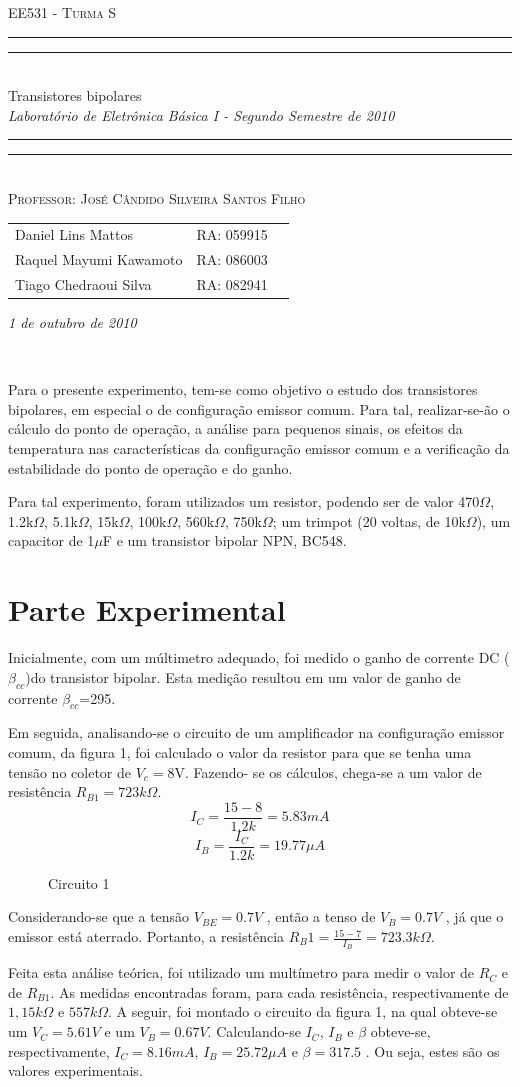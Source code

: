 \documentclass[a4paper]{article} %
\date{Outubro 1, 2010}
\newcommand*{\titleTMB}{\begingroup \centering \settowidth{\unitlength}{\LARGE EE531} {\large\scshape EE531 - Turma S}\\[0.2\baselineskip] \rule{11.0cm}{1.6pt}\vspace*{-\baselineskip}\vspace*{2pt} \rule{11.0cm}{0.4pt}\\[\baselineskip] {\LARGE Transistores bipolares}\\\vspace*{\baselineskip}  {\itshape Laboratório de Eletrônica Básica I - Segundo Semestre de 2010}\\ \rule{11.0cm}{0.4pt}\vspace*{-\baselineskip}\vspace{3.2pt} \rule{11.0cm}{1.6pt}\\[\baselineskip] {\large\scshape Professor: José Cândido Silveira Santos Filho}\par \vfill {\normalsize   \scshape 
    \begin{center} 
      \begin{tabular}{  l  l  p{5cm} } 
 	Daniel Lins Mattos & RA: 059915\\
        Raquel Mayumi Kawamoto & RA: 086003\\
        Tiago Chedraoui Silva  & RA: 082941\\
      \end{tabular} \end{center}
    \itshape 1 de outubro de 2010    }\\[\baselineskip] \vspace{3.2pt} \endgroup}
\begin{document}
\titleTMB 
\newpage

Para o presente experimento, tem-se como objetivo o estudo dos transistores bipolares, em
especial o de configuração emissor comum. Para tal, realizar-se-ão o cálculo do ponto de
operação, a análise para pequenos sinais, os efeitos da temperatura nas características da
configuração emissor comum e a verificação da estabilidade do ponto de operação e do
ganho.

Para tal experimento, foram utilizados um resistor, podendo ser de valor 470$\Omega$, 1.2k$\Omega$, 5.1k$\Omega$,
15k$\Omega$, 100k$\Omega$, 560k$\Omega$, 750k$\Omega$; um trimpot (20 voltas, de 10k$\Omega$), um capacitor de 1$\mu$F e um
transistor bipolar NPN, BC548.

\section*{Parte Experimental}

Inicialmente, com um múltimetro adequado, foi medido o ganho de corrente DC
($\beta_{cc}$)do transistor bipolar. Esta medição resultou em um valor de ganho de corrente
$\beta_{cc}$=295.


Em seguida, analisando-se o circuito de um amplificador na configuração emissor
comum, da figura 1, foi calculado o valor da resistor
para que se tenha uma tensão no
coletor de $V_c=$8V. Fazendo- se os cálculos, chega-se a um valor de resistência
$R_{B1}=723k\Omega$.
\begin{displaymath}
I_C=\frac{15-8}{1.2k}=5.83mA
\end{displaymath}
\begin{displaymath}
I_B=\frac{I_C}{1.2k}=19.77\mu A
\end{displaymath}

\begin{figure}[h]
\centerline{}
\caption{Circuito 1\label{circ:1}}
\end{figure}


Considerando-se que a tensão $V_{BE}=0.7V$ 
, então a tenso de $V_{B}=0.7V$ , já que o
emissor está aterrado. Portanto, a resistência
$R_B1=\frac{15-7}{I_B}=723.3k\Omega$.


Feita esta análise teórica, foi utilizado um multímetro para medir o valor de $R_C$ e de $R_{B1}$. As medidas encontradas foram, para cada resistência, respectivamente de $1,15k\Omega$ e $557k\Omega$. A seguir, foi montado o circuito da figura 1, na qual obteve-se um $V_C=5.61V$ e um $V_B=0.67V$. Calculando-se $I_C$, $I_B$ e $\beta$ obteve-se, respectivamente,
 $I_C=8.16mA$, $I_B=25.72\mu A$ e $\beta=317.5$
. Ou seja, estes são os valores experimentais.
\end{document}
